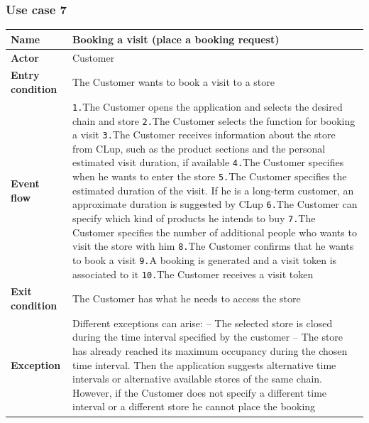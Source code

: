 \documentclass[a4paper,oneside,11pt]{book}   %
\begin{document}
    \subsubsection{Use case 7}
    \begin{longtable}[c] { |>{\bfseries{}}C{0.25\textwidth}|V{0.55\textwidth}| }
        \hline
        Name            & Booking a visit (place a booking request) \\ \hline
        Actor           & Customer \\ \hline
        Entry condition & The Customer wants to book a visit to a store \\ \hline
        Event flow      & 
        \texttt{1.}The Customer opens the application and selects the desired chain and store \newline
        \texttt{2.}The Customer selects the function for booking a visit \newline
        \texttt{3.}The Customer receives information about the store from CLup, such as the product sections and the personal estimated visit duration, if available \newline
        \texttt{4.}The Customer specifies when he wants to enter the store \newline
        \texttt{5.}The Customer specifies the estimated duration of the visit. If he is a long-term customer, an approximate duration is suggested by CLup \newline
        \texttt{6.}The Customer can specify which kind of products he intends to buy \newline
        \texttt{7.}The Customer specifies the number of additional people who wants to visit the store with him  \newline
        \texttt{8.}The Customer confirms that he wants to book a visit \newline
        \texttt{9.}A booking is generated and a visit token is associated to it \newline
        \texttt{10.}The Customer receives a visit token \\ \hline
        Exit condition  & The Customer has what he needs to access the store \\ \hline
        Exception       & Different exceptions can arise: \newline
        -- The selected store is closed during the time interval specified by the customer \newline
        -- The store has already reached its maximum occupancy during the chosen time interval. Then the application suggests alternative time intervals or alternative available stores of the same chain. However, if the Customer does not specify a different time interval or a different store he cannot place the booking \newline

\end{longtable}
\end{document}
